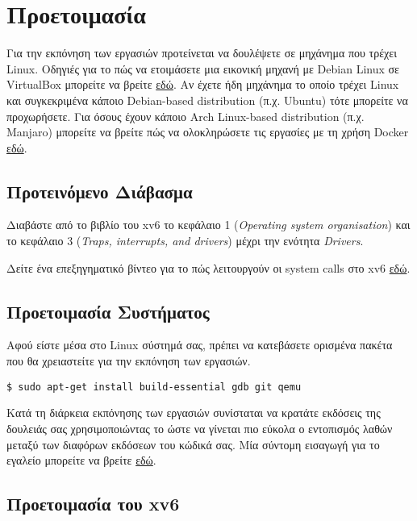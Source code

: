 \documentclass[18pt]{extarticle}
\begin{document}
\section{Προετοιμασία}

Για την εκπόνηση των εργασιών προτείνεται να δουλέψετε σε μηχάνημα που τρέχει Linux.
Οδηγιές για το πώς να ετοιμάσετε μια εικονική μηχανή με Debian Linux σε VirtualBox μπορείτε να βρείτε \href{}{εδώ}. %
Αν έχετε ήδη μηχάνημα το οποίο τρέχει Linux και συγκεκριμένα κάποιο
Debian-based distribution (π.χ. Ubuntu) τότε μπορείτε να προχωρήσετε.
Για όσους έχουν κάποιο Arch Linux-based distribution (π.χ. Manjaro) μπορείτε να βρείτε πώς να ολοκληρώσετε τις εργασίες
με τη χρήση Docker \href{}{εδώ}. %

\subsection{Προτεινόμενο Διάβασμα}

Διαβάστε από το βιβλίο του xv6 \cite{xv6Book} το κεφάλαιο 1 (\textit{Operating
system organisation}) και το κεφάλαιο 3 (\textit{Traps, interrupts, and
drivers}) μέχρι την ενότητα \textit{Drivers}.

Δείτε ένα επεξηγηματικό βίντεο για το πώς λειτουργούν οι system calls στο xv6 \href{https://www.youtube.com/watch?v=w7Q66ItKrn8}{εδώ}.

\subsection{Προετοιμασία Συστήματος}

Αφού είστε μέσα στο Linux σύστημά σας, πρέπει να κατεβάσετε ορισμένα πακέτα που θα χρειαστείτε για την εκπόνηση των εργασιών.

\begin{commandline}
\begin{verbatim}
$ sudo apt-get install build-essential gdb git qemu
\end{verbatim}
\end{commandline}

Κατά τη διάρκεια εκπόνησης των εργασιών συνίσταται να κρατάτε εκδόσεις της δουλειάς σας χρησιμοποιώντας το 
ώστε να γίνεται πιο εύκολα ο εντοπισμός λαθών μεταξύ των διαφόρων εκδόσεων του κώδικά σας.
Μία σύντομη εισαγωγή για το εγαλείο μπορείτε να βρείτε \href{https://rogerdudler.github.io/git-guide/}{εδώ}. 

\subsection{Προετοιμασία του xv6}
\end{document}
